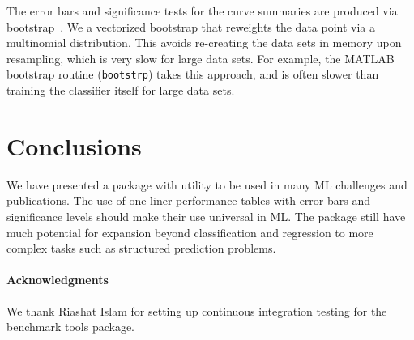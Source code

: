 \documentclass{article}
\newcommand{\code}{\texttt}
\begin{document}
The error bars and significance tests for the curve summaries are produced via bootstrap~\citep{Efron1994}.
We a vectorized bootstrap that reweights the data point via a multinomial distribution.
This avoids re-creating the data sets in memory upon resampling, which is very slow for large data sets.
For example, the MATLAB bootstrap routine (\code{bootstrp}) takes this approach, and is often slower than training the classifier itself for large data sets. 

\section{Conclusions}

We have presented a package with utility to be used in many ML challenges and publications.
The use of one-liner performance tables with error bars and significance levels should make their use universal in ML\@.
The package still have much potential for expansion beyond classification and regression to more complex tasks such as structured prediction problems.

\paragraph{Acknowledgments}
We thank Riashat Islam for setting up continuous integration testing for the benchmark tools package.


\end{document}
